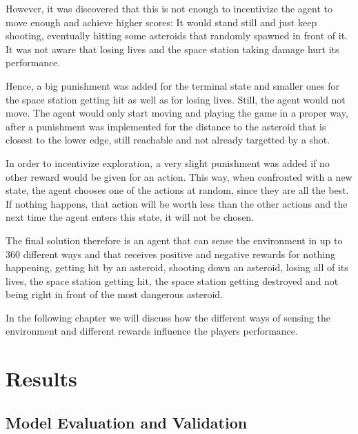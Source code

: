 \documentclass[a4paper,10pt]{article}
\begin{document}
However, it was discovered that this is not enough to incentivize the agent to move enough and achieve higher scores: It would stand still and just keep shooting, eventually hitting some asteroids that randomly spawned in front of it.
It was not aware that losing lives and the space station taking damage hurt its performance.

Hence, a big punishment was added for the terminal state and smaller ones for the space station getting hit as well as for losing lives.
Still, the agent would not move.
The agent would only start moving and playing the game in a proper way, after a punishment was implemented for the distance to the asteroid that is closest to the lower edge, still reachable and not already targetted by a shot.

In order to incentivize exploration, a very slight punishment was added if no other reward would be given for an action.
This way, when confronted with a new state, the agent chooses one of the actions at random, since they are all the best.
If nothing happens, that action will be worth less than the other actions and the next time the agent enters this state, it will not be chosen.

The final solution therefore is an agent that can sense the environment in up to $360$ different ways and that receives positive and negative rewards for nothing happening, getting hit by an asteroid, shooting down an asteroid, losing all of its lives, the space station getting hit, the space station getting destroyed and not being right in front of the most dangerous asteroid.

In the following chapter we will discuss how the different ways of sensing the environment and different rewards influence the players performance.
\section{Results}

\subsection{Model Evaluation and Validation}
\end{document}
